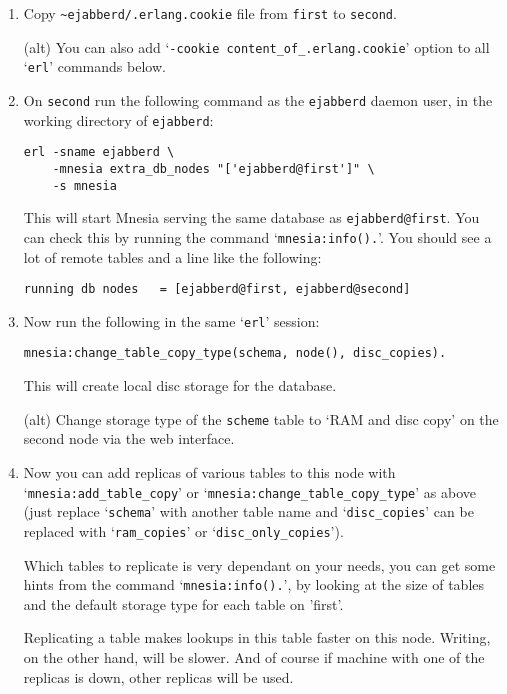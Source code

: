 \documentclass[a4paper,10pt]{book}
\newcommand{\node}[1]{\texttt{#1}}
\newcommand{\term}[1]{\texttt{#1}}
\newcommand{\shell}[1]{\texttt{#1}}
\newcommand{\ejabberd}{\texttt{ejabberd}}
\begin{document}
\begin{enumerate}
\item Copy \verb|~ejabberd/.erlang.cookie| file from \term{first} to
  \term{second}.

  (alt) You can also add `\verb|-cookie content_of_.erlang.cookie|'
  option to all `\shell{erl}' commands below.

\item On \term{second} run the following command as the \ejabberd{} daemon user,
  in the working directory of \ejabberd{}:

\begin{verbatim}
erl -sname ejabberd \
    -mnesia extra_db_nodes "['ejabberd@first']" \
    -s mnesia
\end{verbatim}

  This will start Mnesia serving the same database as \node{ejabberd@first}.
  You can check this by running the command `\verb|mnesia:info().|'. You
  should see a lot of remote tables and a line like the following:

\begin{verbatim}
running db nodes   = [ejabberd@first, ejabberd@second]
\end{verbatim}


\item Now run the following in the same `\shell{erl}' session:

\begin{verbatim}
mnesia:change_table_copy_type(schema, node(), disc_copies).
\end{verbatim}

  This will create local disc storage for the database.

  (alt) Change storage type of the \term{scheme} table to `RAM and disc
  copy' on the second node via the web interface.


\item Now you can add replicas of various tables to this node with
  `\verb|mnesia:add_table_copy|' or
  `\verb|mnesia:change_table_copy_type|' as above (just replace
  `\verb|schema|' with another table name and `\verb|disc_copies|'
  can be replaced with `\verb|ram_copies|' or
  `\verb|disc_only_copies|').

  Which tables to replicate is very dependant on your needs, you can get
  some hints from the command `\verb|mnesia:info().|', by looking at the
  size of tables and the default storage type for each table on 'first'.

  Replicating a table makes lookups in this table faster on this node.
  Writing, on the other hand, will be slower. And of course if machine with one
  of the replicas is down, other replicas will be used.


\end{enumerate}
\end{document}
